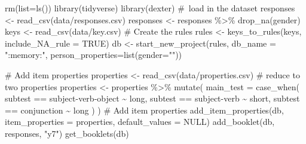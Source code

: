 \documentclass[
  letterpaper,
  DIV=11,
  numbers=noendperiod]{scrreprt}
\newenvironment{Shaded}{\begin{snugshade}}{\end{snugshade}}
\newcommand{\AttributeTok}[1]{\textcolor[rgb]{0.40,0.45,0.13}{#1}}
\newcommand{\CommentTok}[1]{\textcolor[rgb]{0.37,0.37,0.37}{#1}}
\newcommand{\ConstantTok}[1]{\textcolor[rgb]{0.56,0.35,0.01}{#1}}
\newcommand{\FunctionTok}[1]{\textcolor[rgb]{0.28,0.35,0.67}{#1}}
\newcommand{\NormalTok}[1]{\textcolor[rgb]{0.00,0.23,0.31}{#1}}
\newcommand{\OtherTok}[1]{\textcolor[rgb]{0.00,0.23,0.31}{#1}}
\newcommand{\SpecialCharTok}[1]{\textcolor[rgb]{0.37,0.37,0.37}{#1}}
\newcommand{\StringTok}[1]{\textcolor[rgb]{0.13,0.47,0.30}{#1}}
\begin{document}
\begin{Shaded}
\begin{Highlighting}[]
\FunctionTok{rm}\NormalTok{(}\AttributeTok{list=}\FunctionTok{ls}\NormalTok{())}
\FunctionTok{library}\NormalTok{(tidyverse)}
\FunctionTok{library}\NormalTok{(dexter)}
\CommentTok{\# load in the dataset}
\NormalTok{responses }\OtherTok{\textless{}{-}} \FunctionTok{read\_csv}\NormalTok{(}\StringTok{\textquotesingle{}data/responses.csv\textquotesingle{}}\NormalTok{)}
\NormalTok{responses }\OtherTok{\textless{}{-}}\NormalTok{ responses }\SpecialCharTok{\%\textgreater{}\%} \FunctionTok{drop\_na}\NormalTok{(gender)}
\NormalTok{keys }\OtherTok{\textless{}{-}} \FunctionTok{read\_csv}\NormalTok{(}\StringTok{\textquotesingle{}data/key.csv\textquotesingle{}}\NormalTok{)}
\CommentTok{\# Create the rules}
\NormalTok{rules }\OtherTok{\textless{}{-}} \FunctionTok{keys\_to\_rules}\NormalTok{(keys, }\AttributeTok{include\_NA\_rule =} \ConstantTok{TRUE}\NormalTok{)}
\NormalTok{db }\OtherTok{\textless{}{-}} \FunctionTok{start\_new\_project}\NormalTok{(rules, }\AttributeTok{db\_name =} \StringTok{":memory:"}\NormalTok{, }\AttributeTok{person\_properties=}\FunctionTok{list}\NormalTok{(}\AttributeTok{gender=}\StringTok{""}\NormalTok{))}

\CommentTok{\# Add item properties}
\NormalTok{properties }\OtherTok{\textless{}{-}} \FunctionTok{read\_csv}\NormalTok{(}\StringTok{\textquotesingle{}data/properties.csv\textquotesingle{}}\NormalTok{)}
\CommentTok{\# reduce to two properties}
\NormalTok{properties }\OtherTok{\textless{}{-}}\NormalTok{ properties }\SpecialCharTok{\%\textgreater{}\%} \FunctionTok{mutate}\NormalTok{(}
    \AttributeTok{main\_test =} \FunctionTok{case\_when}\NormalTok{(}
\NormalTok{        subtest }\SpecialCharTok{==} \StringTok{\textquotesingle{}subject{-}verb{-}object\textquotesingle{}} \SpecialCharTok{\textasciitilde{}} \StringTok{\textquotesingle{}long\textquotesingle{}}\NormalTok{,}
\NormalTok{        subtest }\SpecialCharTok{==} \StringTok{\textquotesingle{}subject{-}verb\textquotesingle{}} \SpecialCharTok{\textasciitilde{}} \StringTok{\textquotesingle{}short\textquotesingle{}}\NormalTok{,}
\NormalTok{        subtest }\SpecialCharTok{==} \StringTok{\textquotesingle{}conjunction\textquotesingle{}} \SpecialCharTok{\textasciitilde{}} \StringTok{\textquotesingle{}long\textquotesingle{}}
\NormalTok{    )}
\NormalTok{)}
\CommentTok{\# Add item properties}
\FunctionTok{add\_item\_properties}\NormalTok{(db, }\AttributeTok{item\_properties =}\NormalTok{ properties, }\AttributeTok{default\_values =} \ConstantTok{NULL}\NormalTok{)}
\FunctionTok{add\_booklet}\NormalTok{(db, responses, }\StringTok{"y7"}\NormalTok{) }
\FunctionTok{get\_booklets}\NormalTok{(db)}
\end{Highlighting}
\end{Shaded}
\end{document}
